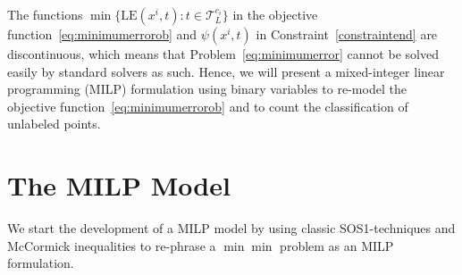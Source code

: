 \documentclass[a4paper,american,reqno]{amsart}
\newcommand{\defsep}{\colon}%
\newcommand{\defset}[3][\defsep]{\set{#2#1#3}}
\newcommand{\set}[1]{\{#1\}}
\newcommand{\LE}{\text{LE}}
\begin{document}
The functions $\min\defset{\LE(x^i,t)}{t\in \mathcal{T}_L^{c_i}}$ in the
objective function~\eqref{eq:minimumerrorob} and $\psi(x^i,t)$ in
Constraint~\eqref{constraintend} are discontinuous, which means that
Problem~\eqref{eq:minimumerror} cannot be solved easily by standard
solvers as such.
Hence, we will present a mixed-integer linear programming (MILP)
formulation using binary variables to re-model the objective
function~\eqref{eq:minimumerrorob} and to count the classification of
unlabeled points.



\section{The MILP Model}
\label{sec:chapter-2}

We start the development of a MILP model by using classic
SOS1-techniques \parencite{SOS1} and McCormick
inequalities \parencite{Mccormick} to re-phrase a $\min \min $ problem
as an MILP formulation.
\end{document}
